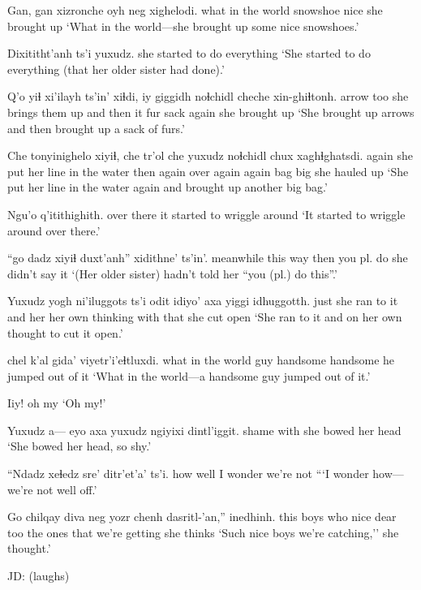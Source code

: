 \documentclass[12pt]{article}
\begin{document}
\gll Gan, {gan xizronche} oyh neg xighelodi.
{} {what in the world} snowshoe nice {she brought up}
\glt `What in the world---she brought up some nice snowshoes.'
\glend

\gll Dixititht'anh ts'i yuxudz.
{she started to do} {} everything
\glt `She started to do everything (that her older sister had done).'
\glend

\gll Q'o yiɬ xi'ilayh ts'in' xiɬdi, iy {giggidh noɬchidl} cheche xin-ghiɬtonh.
arrow too {she brings them up} and then it {fur sack} again {she brought up}
\glt `She brought up arrows and then brought up a sack of furs.'
\glend

\gll Che tonyinighelo xiyiɬ, che tr'ol che yuxudz noɬchidl chux xaghɬghatsdi.
again {she put her line in the water} then again {over again} again {} bag big {she hauled up}
\glt `She put her line in the water again and brought up another big bag.'
\glend

\gll Ngu'o q'itithighith.
{over there} {it started to wriggle around}
\glt `It started to wriggle around over there.'
\glend

 ``{go dadz} xiyiɬ duxt'anh'' xidithne' ts'in'.
meanwhile {this way} then {you pl. do} {she didn't say it}
\glt `(Her older sister) hadn't told her ``you (pl.) do this''.' 
\glend

\gll Yuxudz {yogh ni'iluggots} ts'i odit idiyo' axa yiggi idhuggotth.
just {she ran to it} and her {her own thinking} with that {she cut open}
\glt `She ran to it and on her own thought to cut it open.'
\glend

 chel k'al gida' viyetr'i'eɬtluxdi.
{what in the world} guy handsome handsome {he jumped out of it}
\glt `What in the world---a handsome guy jumped out of it.'
\glend

\gll Iiy! 
{{oh my}}
\glt `Oh my!'
\glend

\gll Yuxudz a--- eyo axa yuxudz {ngiyixi dintl'iggit.}
{} {} shame with {} {she bowed her head}
\glt `She bowed her head, so shy.'
\glend

\gll ``Ndadz xeɬedz sre' {ditr'et'a' ts'i}. 
how   well   {I wonder}   {we're not}                 
\glt  ```I wonder how---we're not well off.'
\glend

\gll Go chilqay diva neg yozr chenh dasritl-'an,'' inedhinh.
this boys  who  nice dear too {the ones that we're getting} {she thinks}
\glt `Such nice boys we're catching,'' she thought.'
\glend

JD:  (laughs)
\end{document}
